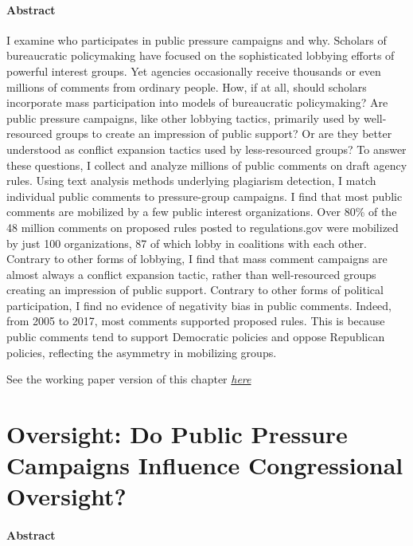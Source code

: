 \documentclass[
]{book}
\begin{document}
\hypertarget{abstract-1}{%
\subsubsection*{Abstract}\label{abstract-1}}

I examine who participates in public pressure campaigns and why. Scholars of bureaucratic policymaking have focused on the sophisticated lobbying efforts of powerful interest groups. Yet agencies occasionally receive thousands or even millions of comments from ordinary people. How, if at all, should scholars incorporate mass participation into models of bureaucratic policymaking? Are public pressure campaigns, like other lobbying tactics, primarily used by well-resourced groups to create an impression of public support? Or are they better understood as conflict expansion tactics used by less-resourced groups? To answer these questions, I collect and analyze millions of public comments on draft agency rules. Using text analysis methods underlying plagiarism detection, I match individual public comments to pressure-group campaigns. I find that most public comments are mobilized by a few public interest organizations. Over 80\% of the 48 million comments on proposed rules posted to regulations.gov were mobilized by just 100 organizations, 87 of which lobby in coalitions with each other. Contrary to other forms of lobbying, I find that mass comment campaigns are almost always a conflict expansion tactic, rather than well-resourced groups creating an impression of public support. Contrary to other forms of political participation, I find no evidence of negativity bias in public comments. Indeed, from 2005 to 2017, most comments supported proposed rules. This is because public comments tend to support Democratic policies and oppose Republican policies, reflecting the asymmetry in mobilizing groups.

See the working paper version of this chapter \href{https://judgelord.github.io/research/whymail/}{\emph{here}}

\hypertarget{oversight-do-public-pressure-campaigns-influence-congressional-oversight}{%
\chapter{Oversight: Do Public Pressure Campaigns Influence Congressional Oversight?}\label{oversight-do-public-pressure-campaigns-influence-congressional-oversight}}

\hypertarget{abstract-2}{%
\subsubsection*{Abstract}\label{abstract-2}}
\end{document}
